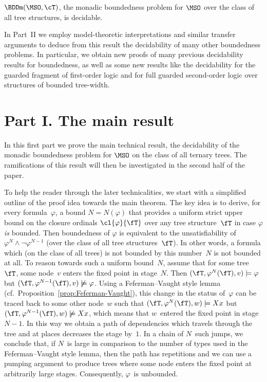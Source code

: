 \documentclass{LMCS}
\begin{document}
\begin{thm}
$\BDDm(\MSO,\cT)$, the monadic boundedness problem for $\MSO$
over the class of all tree structures, is decidable.
\end{thm}

In Part~II we employ model-theoretic interpretations and similar transfer arguments
to deduce from this result the decidability of many other boundedness problems.
In particular, we obtain new proofs of many previous decidability results
for boundedness,
as well as some new results like the decidability for the guarded fragment
of first-order logic and for full guarded second-order logic over structures
of bounded tree-width.


\bigskip
\section*{Part I. The main result}


In this first part we prove the main technical result, the decidability
of the monadic boundedness problem for $\MSO$ on the class of all ternary trees.
The ramifications of this result will then be investigated
in the second half of the paper.



\medskip
To help the reader through the later technicalities,
we start with a simplified outline of the proof idea
towards the main theorem.
The key idea is to derive, for every formula~$\varphi$, a
bound $N = N(\varphi)$ that provides a uniform strict upper bound on the
closure ordinals $\cl{\varphi}{\fT}$ over any tree structure~$\fT$ in case
$\varphi$ \emph{is} bounded.
Then boundedness of $\varphi$ is equivalent to the unsatisfiability
of $\varphi^N \wedge \neg \varphi^{N-1}$
(over the class of all tree structures~$\fT$).
In other words, a formula which (on the class of all trees)
is not bounded by this number~$N$ is not bounded at all.
To reason towards such a uniform bound~$N$,
assume that for some tree~$\fT$,
some node~$v$ enters the fixed point in stage~$N$.
Then $(\fT,\varphi^N(\fT),v) \models \varphi$
but $(\fT,\varphi^{N-1}(\fT),v) \not\models \varphi$.
Using a Feferman--Vaught style lemma (cf.~Proposition~\ref{prop:Feferman-Vaught}),
this change in the status of~$\varphi$ can be traced back to some other node~$w$
such that $(\fT,\varphi^N(\fT),w) \models Xx$
but $(\fT,\varphi^{N-1}(\fT),w) \not\models Xx$,
which means that $w$~entered the fixed point in stage $N-1$.
In this way we obtain a path of dependencies
which travels through the tree
and at places decreases the stage by~$1$.
In a chain of $N$~such jumps,
we conclude that, if $N$~is large
in comparison to the number of types used in the Feferman--Vaught style lemma,
then the path has repetitions and we can use a pumping argument
to produce trees where some node enters the fixed point at arbitrarily large stages.
Consequently, $\varphi$~is unbounded.
\end{document}
